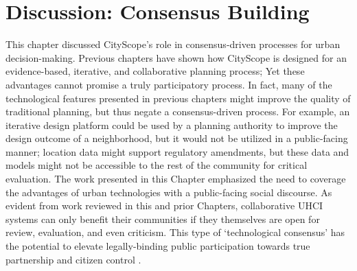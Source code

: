 {    %
    
    
    
    \section{Discussion: Consensus Building}\label{sec:cons-decentralizing}
    {
        This chapter discussed CityScope's role in consensus-driven processes for urban decision-making. Previous chapters have shown how CityScope is designed for an evidence-based, iterative, and collaborative planning process; Yet these advantages cannot promise a truly participatory process. In fact, many of the technological features presented in previous chapters might improve the quality of traditional planning, but thus negate a consensus-driven process. For example, an iterative design platform could be used by a planning authority to improve the design outcome of a neighborhood, but it would not be utilized in a public-facing manner; location data might support regulatory amendments, but these data and models might not be accessible to the rest of the community for critical evaluation.
        \newline
        The work presented in this Chapter emphasized the need to coverage the advantages of urban technologies with a public-facing social discourse. As evident from work reviewed in this and prior Chapters, collaborative UHCI systems can only benefit their communities if they themselves are open for review, evaluation, and even criticism. This type of `technological consensus' has the potential to elevate legally-binding public participation towards true partnership and citizen control \cite{arnstein1969ladder, Innes2016}.
    }
}

